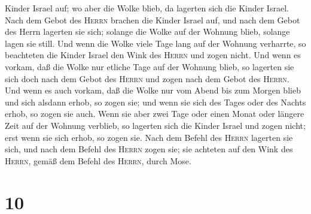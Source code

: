 Kinder Israel auf; wo aber die Wolke blieb, da lagerten sich die Kinder
Israel.  Nach dem Gebot des \textsc{Herrn} brachen die
Kinder Israel auf, und nach dem Gebot des Herrn lagerten sie sich;
solange die Wolke auf der Wohnung blieb, solange lagen sie still.
 Und wenn die Wolke viele Tage lang auf der Wohnung
verharrte, so beachteten die Kinder Israel den Wink des \textsc{Herrn}
und zogen nicht.  Und wenn es vorkam, daß die Wolke nur
etliche Tage auf der Wohnung blieb, so lagerten sie sich doch nach dem
Gebot des \textsc{Herrn} und zogen nach dem Gebot des \textsc{Herrn}.
 Und wenn es auch vorkam, daß die Wolke nur vom Abend bis
zum Morgen blieb und sich alsdann erhob, so zogen sie; und wenn sie sich
des Tages oder des Nachts erhob, so zogen sie auch.  Wenn
sie aber zwei Tage oder einen Monat oder längere Zeit auf der Wohnung
verblieb, so lagerten sich die Kinder Israel und zogen nicht; erst wenn
sie sich erhob, so zogen sie.  Nach dem Befehl des
\textsc{Herrn} lagerten sie sich, und nach dem Befehl des \textsc{Herrn}
zogen sie; sie achteten auf den Wink des \textsc{Herrn}, gemäß dem
Befehl des \textsc{Herrn}, durch Mose.

\hypertarget{section-9}{%
\section{10}\label{section-9}}

